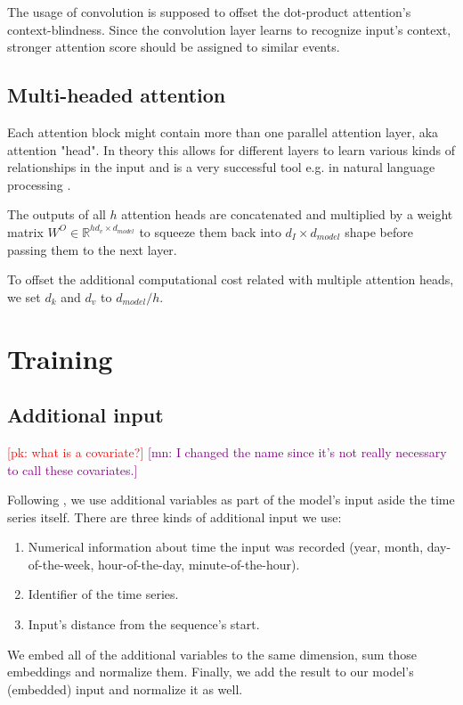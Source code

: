 \documentclass[en]{pracamgr}
\newcommand{\pk}[1]{\textcolor{red}{\small [pk: #1]}}
\newcommand{\mn}[1]{\textcolor{purple}{\small [mn: #1]}}
\begin{document}
The usage of convolution is supposed to offset the dot-product attention's context-blindness. Since the convolution layer learns to recognize input's context, stronger attention score should be assigned to similar events.

\subsection{Multi-headed attention}

Each attention block might contain more than one parallel attention layer, aka attention "head". In theory this allows for different layers to learn various kinds of relationships in the input and is a very successful tool e.g. in natural language processing \cite{tr}.

The outputs of all $h$ attention heads are concatenated and multiplied by a weight matrix $W^O \in \mathbb{R}^{hd_{v} \times d_{model}}$ to squeeze them back into $d_I \times d_{model}$ shape before passing them to the next layer.

To offset the additional computational cost related with multiple attention heads, we set $d_k$ and $d_v$ to $d_{model} / h$.

\section{Training}

\subsection{Additional input} \pk{what is a covariate?} \mn{I changed the name since it's not really necessary to call these covariates.}

Following \cite{enhancing}, we use additional variables as part of the model's input aside the time series itself.
There are three kinds of additional input we use:
\begin{enumerate}
	\item Numerical information about time the input was recorded (year, month, day-of-the-week, hour-of-the-day, minute-of-the-hour). 
	\item Identifier of the time series.
	\item Input's distance from the sequence's start. 
\end{enumerate}
We embed all of the additional variables to the same dimension, sum those embeddings and normalize them. Finally, we add the result to our model's (embedded) input and normalize it as well.
\end{document}

